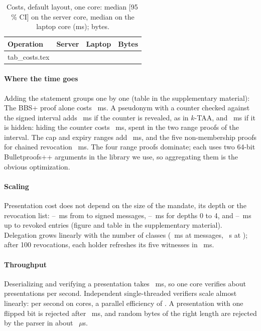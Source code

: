 \begin{table}[t]\centering\caption{Costs, default layout, one core: median [95\,\% CI] on the server core, median on the laptop core (ms); bytes.}\label{tab:costs}
\footnotesize\setlength{\tabcolsep}{2pt}
\begin{tabular}{@{}lrrr@{}}\toprule Operation & Server & Laptop & Bytes\\\midrule
{} tab_costs.tex \end{tabular}\end{table}

\paragraph*{Where the time goes} Adding the statement groups one by one (table in the supplementary material): The BBS+ proof alone costs \AblBbsPres{}~ms. A pseudonym with a counter checked against the signed interval adds \AblRevAdd{}~ms if the counter is revealed, as in $k$-TAA, and \AblDyAdd{}~ms if it is hidden: hiding the counter costs \AblHideCost{}~ms, spent in the two range proofs of the interval. The cap and expiry ranges add \AblRangeAdd{}~ms, and the five non-membership proofs for chained revocation \AblNmAdd{}~ms. The four range proofs dominate; each uses two 64-bit Bulletproofs++ arguments in the library we use, so aggregating them is the obvious optimization.

\paragraph*{Scaling} Presentation cost does not depend on the size of the mandate, its depth or the revocation list: \MsgPresMin{}--\MsgPresMax{}~ms from \MsgLo{} to \MsgHi{} signed messages, \DepthPresMin{}--\DepthPresMax{}~ms for depths 0 to 4, and \RevPresMin{}--\RevPresMax{}~ms up to \RevMax{} revoked entries (figure and table in the supplementary material). Delegation grows linearly with the number of classes (\DelMsgLoMs{}~ms at \MsgLo{} messages, \DelMsgHiS{}~s at \MsgHi{}); after 100 revocations, each holder refreshes its five witnesses in \RevRefreshMs{}~ms.

\paragraph*{Throughput} Deserializing and verifying a presentation takes \ThrVerMs{}~ms, so one core verifies about \ThrPerCore{} presentations per second. Independent single-threaded verifiers scale almost linearly: \ThrMpRate{} per second on \ThrMpCores{} cores, a parallel efficiency of \ThrMpEff{}. A presentation with one flipped bit is rejected after \ThrBadMs{}~ms, and random bytes of the right length are rejected by the parser in about \ThrGarbageUs{}~$\mu$s.




